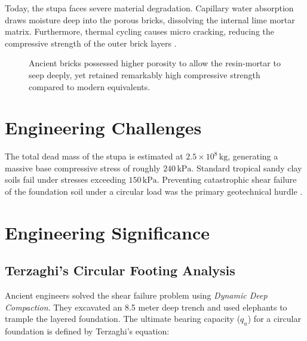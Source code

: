 \documentclass[12pt,a4paper]{report}
\begin{document}
	Today, the stupa faces severe material degradation. Capillary water absorption draws moisture deep into the porous bricks, dissolving the internal lime mortar matrix. Furthermore, thermal cycling causes micro cracking, reducing the compressive strength of the outer brick layers \cite{munasinghe2018}.
	
	\begin{figure}[H]
		\centering
		\caption{Ancient bricks possessed higher porosity to allow the resin-mortar to seep deeply, yet retained remarkably high compressive strength compared to modern equivalents.}
		\label{fig:porosity_strength}
	\end{figure}
	
	\section{Engineering Challenges}
	The total dead mass of the stupa is estimated at $2.5 \times 10^8 \, \text{kg}$, generating a massive base compressive stress of roughly $240 \, \text{kPa}$. Standard tropical sandy clay soils fail under stresses exceeding $150 \, \text{kPa}$. Preventing catastrophic shear failure of the foundation soil under a circular load was the primary geotechnical hurdle \cite{ratnayake2019}.
	
	\section{Engineering Significance}
	
	\subsection{Terzaghi’s Circular Footing Analysis}
	Ancient engineers solved the shear failure problem using \textit{Dynamic Deep Compaction}. They excavated an 8.5 meter deep trench and used elephants to trample the layered foundation. The ultimate bearing capacity ($q_u$) for a circular foundation is defined by Terzaghi's equation:
	
\end{document}
